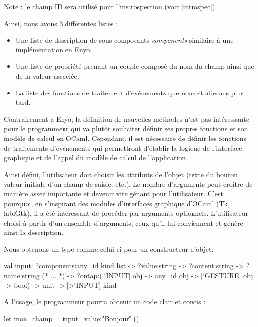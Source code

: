 \documentclass[11pt,a4paper]{report}
\begin{document}
Note : le champ ID sera utilisé pour l'instrospection (voir \ref{introspec}).

Ainsi, nous avons 3 différentes listes :
\begin{itemize}
\item Une liste de description de sous-composants \emph{components} similaire à
  une implémentation en Enyo.
\item Une liste de propriété prenant un couple composé du nom du champ ainsi 
  que de la valeur associée.
\item La liste des fonctions de traitement d'événements que nous étudierons plus tard.
\end{itemize}

Contrairement à Enyo, la définition de nouvelles méthodes n'est pas intéressante pour le programmeur
qui va plutôt souhaiter définir ses propres fonctions et son modèle de calcul en OCaml.
Cependant, il est nécessaire de définir les fonctions de traitements d'événements qui permettront
d'établir la logique de l'interface graphique et de l'appel du modèle de calcul de l'application.

Ainsi défini, l'utilisateur doit choisir les attributs de l'objet (texte du bouton, valeur initiale
d'un champ de saisie, etc.). Le nombre d'arguments peut croitre de manière assez importante et devenir
vite génant pour l'utilisateur.
C'est pourquoi, en s'inspirant des modules d'interfaces graphique d'OCaml (Tk, lablGtk), il a été intéressant de
procéder par arguments optionnels. L'utilisateur choisi à partir d'un ensemble d'arguments, ceux qu'il 
lui conviennent et génère ainsi la description.

Nous obtenons un type comme celui-ci pour un constructeur d'objet:
\begin{OCaml}
  val input:
            ?components:any_id kind list
            -> ?value:string
            -> ?content:string
            -> ?name:string
            (* ... *)
     	    -> ?ontap:([`INPUT] obj -> any_id obj -> [`GESTURE] obj -> bool)
  	    -> unit -> [>`INPUT] kind
\end{OCaml}

A l'usage, le programmeur pourra obtenir un code clair et concis :
\begin{OCaml}
  let mon_champ = input ~value:"Bonjour" ()
\end{OCaml}
\end{document}
